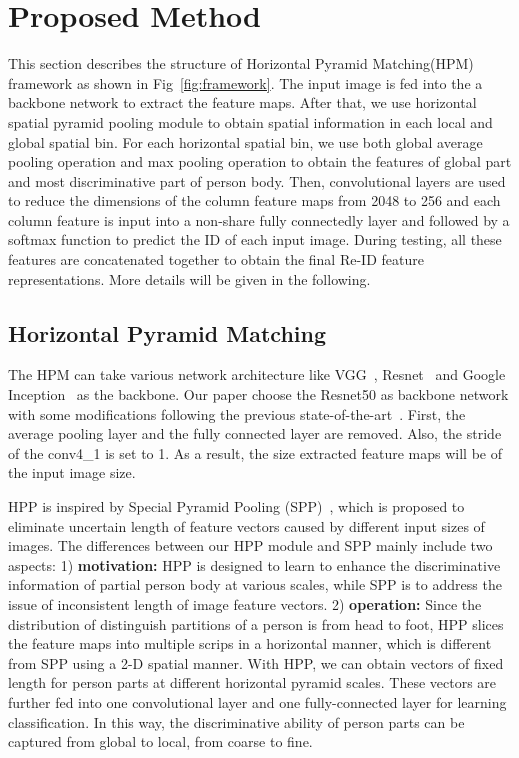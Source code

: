 \documentclass[letterpaper]{article} \usepackage{aaai19}  \usepackage{times}  \usepackage{helvet}  \usepackage{courier}  \usepackage{url}  \usepackage{graphicx}  \frenchspacing  \setlength{\pdfpagewidth}{8.5in}  \setlength{\pdfpageheight}{11in}  \usepackage{multirow}
\begin{document}
 \section{Proposed Method}
This section describes the structure of Horizontal Pyramid Matching(HPM) framework as shown in Fig~\ref{fig:framework}. The input image is fed into the a backbone network to extract the feature maps. After that, we use horizontal spatial pyramid pooling module to obtain spatial information in each local and global spatial bin. For each horizontal spatial bin, we use both global average pooling operation and max pooling operation to obtain the features of global part and most discriminative part of person body. Then, convolutional layers are used to reduce the dimensions of the column feature maps from 2048 to 256 and each column feature is input into a non-share fully connectedly layer and followed by a softmax function to predict the ID of each input image. During testing, all these features are concatenated together to obtain the final Re-ID feature representations. More details will be given in the following.
\subsection{Horizontal Pyramid Matching}


 The HPM can take various network architecture like VGG~\cite{simonyan2014very}, Resnet~\cite{he2016deep} and Google Inception~\cite{szegedy2016rethinking} as the backbone. Our paper choose the Resnet50 as backbone network with some modifications following the previous state-of-the-art~\cite{sun2017beyond}. First, the average pooling layer and the fully connected layer are removed. Also, the stride of the conv4\_{1} is set to 1. As a result, the size extracted feature maps will be  of the input image size.

HPP is inspired by Special Pyramid Pooling (SPP)~\cite{he2014spatial}, which is proposed to eliminate uncertain length of feature vectors caused by different input sizes of images. The differences between our HPP module and SPP mainly include two aspects: 1) {\bf motivation: } HPP is designed to learn to enhance the discriminative information of partial person body at various scales, while SPP is to address the issue of inconsistent length of image feature vectors. 2) {\bf operation: } Since the distribution of distinguish partitions of a person is from head to foot, HPP slices the feature maps into multiple scrips in a horizontal manner, which is different from SPP using a 2-D spatial manner. With HPP, we can obtain vectors of fixed length for person parts at different horizontal pyramid scales. These vectors are further fed into one convolutional layer and one fully-connected layer for learning classification. In this way, the discriminative ability of person parts can be captured from global to local, from coarse to fine.    
\end{document}
